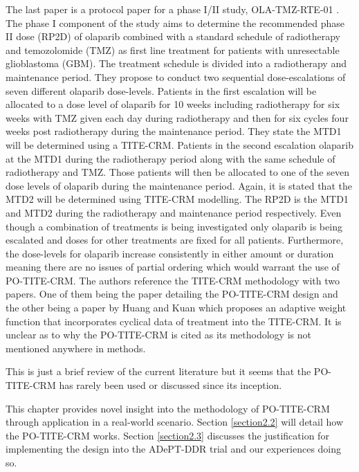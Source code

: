 The last paper is a protocol paper for a phase \RN{1}/\RN{2} study, OLA-TMZ-RTE-01 \cite{lesueurPhaseIIaStudy2019}. The phase \RN{1} component of the study aims to determine the recommended phase \RN{2} dose (RP2D) of olaparib combined with a standard schedule of radiotherapy and temozolomide (TMZ) as first line treatment for patients with unresectable glioblastoma (GBM). The treatment schedule is divided into a radiotherapy and maintenance period. They propose to conduct two sequential dose-escalations of seven different  olaparib dose-levels. Patients in the first escalation will be allocated to a dose level of olaparib for 10 weeks including radiotherapy for six weeks with TMZ given each day during radiotherapy and then for six cycles four weeks post radiotherapy during the maintenance period. They state the MTD1 will be determined using a TITE-CRM. Patients in the second escalation olaparib at the MTD1 during the radiotherapy period along with the same schedule of radiotherapy and TMZ. Those patients will then be allocated to one of the seven dose levels of olaparib during the maintenance period. Again, it is stated that the MTD2 will be determined using TITE-CRM modelling. The RP2D is the MTD1 and MTD2 during the radiotherapy and maintenance period respectively. Even though a combination of treatments is being investigated only olaparib is being escalated and doses for other treatments are fixed for all patients. Furthermore, the dose-levels for olaparib increase consistently in either amount or duration meaning there are no issues of partial ordering which would warrant the use of PO-TITE-CRM. The authors reference the TITE-CRM methodology with two papers. One of them being the paper detailing the PO-TITE-CRM design and the other being a paper by Huang and Kuan \cite{huangTimetoeventContinualReassessment2014} which proposes an adaptive weight function that incorporates cyclical data of treatment into the TITE-CRM. It is unclear as to why the PO-TITE-CRM is cited as its methodology is not mentioned anywhere in methods.       

This is just a brief review of the current literature but it seems that the PO-TITE-CRM has rarely been used or discussed since its inception. 

This chapter provides novel insight into the methodology of PO-TITE-CRM through application in a real-world scenario. Section \ref{section2.2} will detail how the PO-TITE-CRM works. Section \ref{section2.3} discusses the justification for implementing the design into the ADePT-DDR trial and our experiences doing so.  

